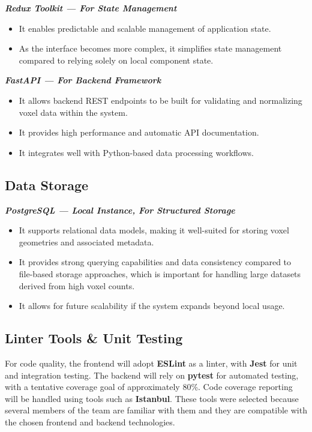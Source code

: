 \documentclass{article}
\begin{document}
\textbf{\textit{Redux Toolkit — For State Management}}
\begin{itemize}
  \item It enables predictable and scalable management of application state.
  \item As the interface becomes more complex, it simplifies state management compared to relying solely on local component state.
\end{itemize}

\textbf{\textit{FastAPI — For Backend Framework}}
\begin{itemize}
  \item It allows backend REST endpoints to be built for validating and normalizing voxel data within the system.
  \item It provides high performance and automatic API documentation.
  \item It integrates well with Python-based data processing workflows.
\end{itemize}

\subsection{Data Storage}

\textbf{\textit{PostgreSQL — Local Instance, For Structured Storage}}
\begin{itemize}
  \item It supports relational data models, making it well-suited for storing voxel geometries and associated metadata.
  \item It provides strong querying capabilities and data consistency compared to file-based storage approaches, which is important for handling large datasets derived from high voxel counts.
  \item It allows for future scalability if the system expands beyond local usage.
\end{itemize}

\subsection{Linter Tools \& Unit Testing}

For code quality, the frontend will adopt \textbf{ESLint} as a linter, with \textbf{Jest} for unit and integration testing. The backend will rely on \textbf{pytest} for automated testing, with a tentative coverage goal of approximately 80\%. Code coverage reporting will be handled using tools such as \textbf{Istanbul}. These tools were selected because several members of the team are familiar with them and they are compatible with the chosen frontend and backend technologies.
\end{document}
